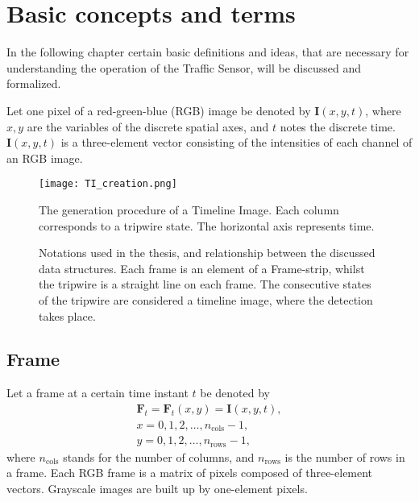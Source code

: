 \setcounter{chapter}{0}%
\renewcommand{\thechapter}{\arabic{chapter}}%
\chapter{Basic concepts and terms}\label{chap:Concepts}
In the following chapter certain basic definitions and ideas, that are necessary for understanding the operation of the Traffic Sensor, will be discussed and formalized.

Let one pixel of a red-green-blue (RGB) image be denoted by $\boldsymbol{I}(x,y,t)$, where $x, y$ are the variables of the discrete spatial axes, and $t$ notes the discrete time.
$\boldsymbol{I}(x,y,t)$ is a three-element vector consisting of the intensities of each channel of an RGB image.
\begin{figure}[bh]
	\centering
	\texttt{[image: TI\_creation.png]}
	\caption[Generation procedure of a Timeline Image]{The generation procedure of a Timeline Image. Each column corresponds to a tripwire state. The horizontal axis represents time.\label{fig:TI_creation}}
\end{figure}
\begin{figure}[h!]
	\centering
	\scalebox{.7}{}
	\caption[Visualization of the notations used in the thesis]{Notations used in the thesis, and relationship between the discussed data structures. Each frame is an element of a Frame-strip, whilst the tripwire is a straight line on each frame. The consecutive states of the tripwire are considered a timeline image, where the detection takes place.	\label{fig:notations}}
\end{figure}
\section{Frame}
Let a frame at a certain time instant $t$ be denoted by
\begin{gather*}
	\boldsymbol{F}_t=\boldsymbol{F}_t(x,y)=\boldsymbol{I}(x,y,t),\\
	x=0,1,2,\dotsc,n_{\text{cols}}-1,\\
	y=0,1,2,\dotsc,n_{\text{rows}}-1,
\end{gather*}
where $n_{\text{cols}}$ stands for the number of columns, and $n_{\text{rows}}$ is the number of rows in a frame.
Each RGB frame is a matrix of pixels composed of three-element vectors.
Grayscale images are built up by one-element pixels.

